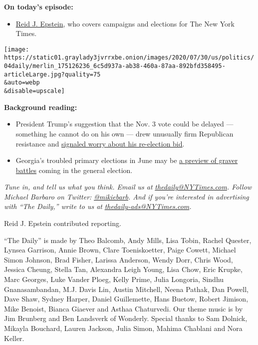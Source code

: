 \textbf{On today's episode:}

\begin{itemize}
\tightlist
\item
  \href{https://www.nytimes3xbfgragh.onion/by/reid-j-epstein}{Reid J.
  Epstein}, who covers campaigns and elections for The New York Times.
\end{itemize}

\texttt{[image: https://static01.graylady3jvrrxbe.onion/images/2020/07/30/us/politics/04daily/merlin\_175126236\_6c5d937a-ab38-460a-87aa-892bfd358495-articleLarge.jpg?quality=75\\\&auto=webp\\\&disable=upscale]}

\textbf{Background reading:}

\begin{itemize}
\item
  President Trump's suggestion that the Nov. 3 vote could be delayed ---
  something he cannot do on his own --- drew unusually firm Republican
  resistance and
  \href{https://www.nytimes3xbfgragh.onion/2020/07/30/us/politics/trump-delay-2020-election.html}{signaled
  worry about his re-election bid}.
\item
  Georgia's troubled primary elections in June may be
  \href{https://www.nytimes3xbfgragh.onion/2020/06/11/podcasts/the-daily/georgia-general-election.html}{a
  preview of graver battles} coming in the general election.
\end{itemize}

\emph{Tune in, and tell us what you think. Email us at}
\href{mailto:thedaily@NYTimes.com}{\emph{thedaily@NYTimes.com}}\emph{.
Follow Michael Barbaro on Twitter:}
\href{https://twitter.com/mikiebarb}{\emph{@mikiebarb}}\emph{. And if
you're interested in advertising with ``The Daily,'' write to us at}
\href{mailto:thedaily-ads@NYTimes.com}{\emph{thedaily-ads@NYTimes.com}}\emph{.}

Reid J. Epstein contributed reporting.

``The Daily'' is made by Theo Balcomb, Andy Mills, Lisa Tobin, Rachel
Quester, Lynsea Garrison, Annie Brown, Clare Toeniskoetter, Paige
Cowett, Michael Simon Johnson, Brad Fisher, Larissa Anderson, Wendy
Dorr, Chris Wood, Jessica Cheung, Stella Tan, Alexandra Leigh Young,
Lisa Chow, Eric Krupke, Marc Georges, Luke Vander Ploeg, Kelly Prime,
Julia Longoria, Sindhu Gnanasambandan, M.J. Davis Lin, Austin Mitchell,
Neena Pathak, Dan Powell, Dave Shaw, Sydney Harper, Daniel Guillemette,
Hans Buetow, Robert Jimison, Mike Benoist, Bianca Giaever and Asthaa
Chaturvedi. Our theme music is by Jim Brunberg and Ben Landsverk of
Wonderly. Special thanks to Sam Dolnick, Mikayla Bouchard, Lauren
Jackson, Julia Simon, Mahima Chablani and Nora Keller.


